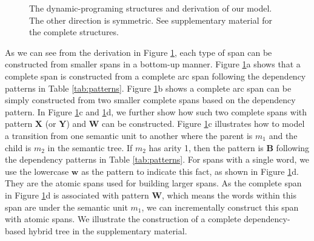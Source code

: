 \begin{figure}[t!]
\begin{subfigure}{0.6\linewidth}
	\end{subfigure}
	\caption{The dynamic-programing structures and derivation of our model. The other direction is symmetric. See supplementary material for the complete structures.}
	\label{fig:modelderivation}
\end{figure}



As we can see from the derivation in Figure \ref{fig:modelderivation}, each type of span can be constructed from smaller spans in a bottom-up manner.  
Figure \ref{fig:modelderivation}a shows that a {complete span} is constructed from a {complete arc span} following the dependency patterns in Table \ref{tab:patterns}. 
Figure \ref{fig:modelderivation}b shows a {complete arc span} can be simply constructed from two smaller complete spans based on the dependency pattern.  
In Figure \ref{fig:modelderivation}c and \ref{fig:modelderivation}d, we further show how such two complete spans with pattern $\mathbf{X}$ (or $\mathbf{Y}$) and $\mathbf{W}$ can be constructed.
Figure \ref{fig:modelderivation}c illustrates how to model a transition from one semantic unit to another where the parent is $m_1$ and the child is $m_2$ in the semantic tree. 
If $m_2$ has arity 1, then the pattern is $\mathbf{B}$ following the dependency patterns in Table \ref{tab:patterns}. 
For spans with a single word, we use the lowercase $\mathbf{w}$ as the pattern to indicate this fact, as shown in Figure \ref{fig:modelderivation}d. 
They are the atomic spans used for building larger spans. 
As the {complete span} in Figure \ref{fig:modelderivation}d is associated with pattern $\mathbf{W}$, which means the words within this span are under the semantic unit $m_1$, we can incrementally construct this span with atomic spans.
We illustrate the construction of a complete dependency-based hybrid tree in the supplementary material. 



